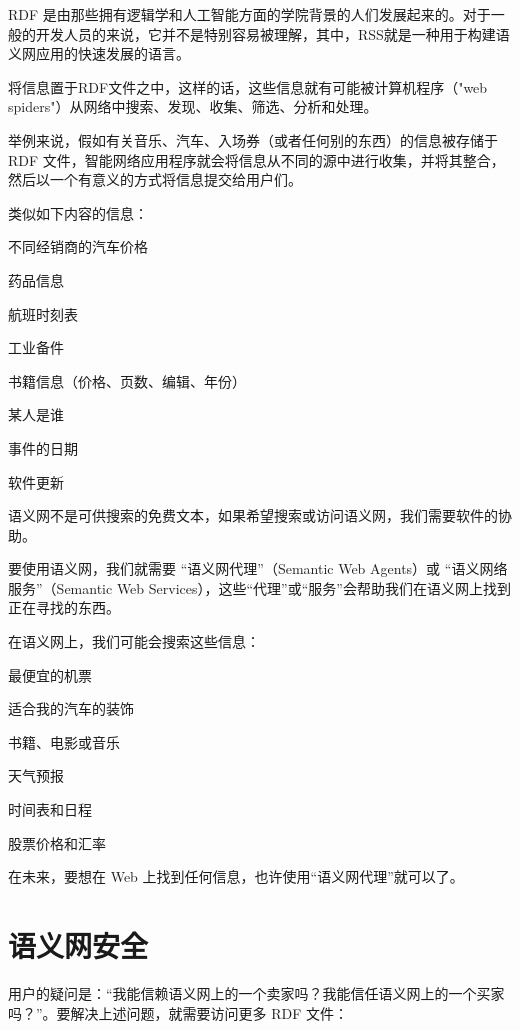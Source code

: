 RDF 是由那些拥有逻辑学和人工智能方面的学院背景的人们发展起来的。对于一般的开发人员的来说，它并不是特别容易被理解，其中，RSS就是一种用于构建语义网应用的快速发展的语言。

将信息置于RDF文件之中，这样的话，这些信息就有可能被计算机程序（"web spiders"）从网络中搜索、发现、收集、筛选、分析和处理。


举例来说，假如有关音乐、汽车、入场券（或者任何别的东西）的信息被存储于 RDF 文件，智能网络应用程序就会将信息从不同的源中进行收集，并将其整合，然后以一个有意义的方式将信息提交给用户们。


类似如下内容的信息：

\begin{compactitem}
\item 不同经销商的汽车价格
\item 药品信息
\item 航班时刻表
\item 工业备件
\item 书籍信息（价格、页数、编辑、年份）
\item 某人是谁
\item 事件的日期
\item 软件更新
\end{compactitem}


语义网不是可供搜索的免费文本，如果希望搜索或访问语义网，我们需要软件的协助。

要使用语义网，我们就需要 “语义网代理”（Semantic Web Agents）或 “语义网络服务”（Semantic Web Services），这些“代理”或“服务”会帮助我们在语义网上找到正在寻找的东西。

在语义网上，我们可能会搜索这些信息：

\begin{compactitem}
\item 最便宜的机票
\item 适合我的汽车的装饰
\item 书籍、电影或音乐
\item 天气预报
\item 时间表和日程
\item 股票价格和汇率
\end{compactitem}

在未来，要想在 Web 上找到任何信息，也许使用“语义网代理”就可以了。


\section{语义网安全}

用户的疑问是：“我能信赖语义网上的一个卖家吗？我能信任语义网上的一个买家吗？”。要解决上述问题，就需要访问更多 RDF 文件：

